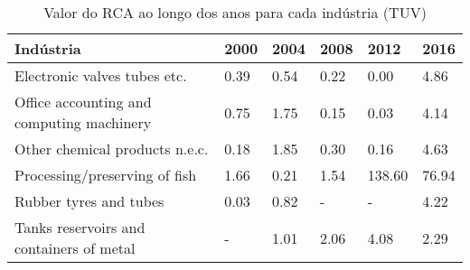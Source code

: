 \begin{table}
\centering
\caption{Valor do RCA ao longo dos anos para cada indústria (TUV)}
\begin{tabular}{p{6cm}p{1.5cm}p{1.5cm}p{1.5cm}p{1.5cm}p{1.5cm}}
\toprule
                                Indústria & 2000 & 2004 & 2008 &   2012 &  2016 \\
\midrule
             Electronic valves tubes etc. & 0.39 & 0.54 & 0.22 &   0.00 &  4.86 \\
Office accounting and computing machinery & 0.75 & 1.75 & 0.15 &   0.03 &  4.14 \\
           Other chemical products n.e.c. & 0.18 & 1.85 & 0.30 &   0.16 &  4.63 \\
            Processing/preserving of fish & 1.66 & 0.21 & 1.54 & 138.60 & 76.94 \\
                   Rubber tyres and tubes & 0.03 & 0.82 &    - &      - &  4.22 \\
 Tanks reservoirs and containers of metal &    - & 1.01 & 2.06 &   4.08 &  2.29 \\
\bottomrule
\end{tabular}
\end{table}
